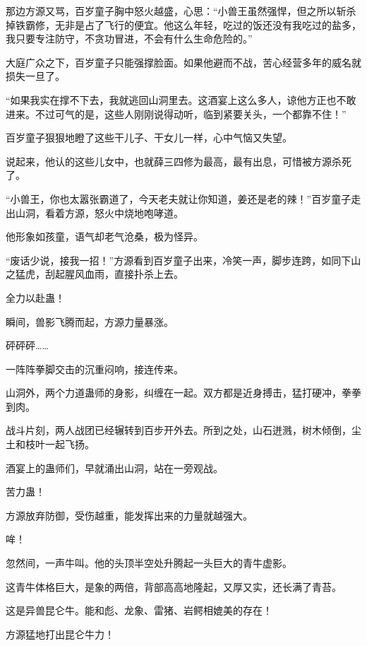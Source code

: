 
\begin{this_body}



那边方源又骂，百岁童子胸中怒火越盛，心思：“小兽王虽然强悍，但之所以斩杀掉铁霸修，无非是占了飞行的便宜。他这么年轻，吃过的饭还没有我吃过的盐多，我只要专注防守，不贪功冒进，不会有什么生命危险的。”

大庭广众之下，百岁童子只能强撑脸面。如果他避而不战，苦心经营多年的威名就损失一旦了。

“如果我实在撑不下去，我就逃回山洞里去。这酒宴上这么多人，谅他方正也不敢进来。不过可气的是，这些人刚刚说得动听，临到紧要关头，一个都靠不住！”

百岁童子狠狠地瞪了这些干儿子、干女儿一样，心中气恼又失望。

说起来，他认的这些儿女中，也就薛三四修为最高，最有出息，可惜被方源杀死了。

“小兽王，你也太嚣张霸道了，今天老夫就让你知道，姜还是老的辣！”百岁童子走出山洞，看着方源，怒火中烧地咆哮道。

他形象如孩童，语气却老气沧桑，极为怪异。

“废话少说，接我一招！”方源看到百岁童子出来，冷笑一声，脚步连跨，如同下山之猛虎，刮起腥风血雨，直接扑杀上去。

全力以赴蛊！

瞬间，兽影飞腾而起，方源力量暴涨。

砰砰砰……

一阵阵拳脚交击的沉重闷响，接连传来。

山洞外，两个力道蛊师的身影，纠缠在一起。双方都是近身搏击，猛打硬冲，拳拳到肉。

战斗片刻，两人战团已经辗转到百步开外去。所到之处，山石迸溅，树木倾倒，尘土和枝叶一起飞扬。

酒宴上的蛊师们，早就涌出山洞，站在一旁观战。

苦力蛊！

方源放弃防御，受伤越重，能发挥出来的力量就越强大。

哞！

忽然间，一声牛叫。他的头顶半空处升腾起一头巨大的青牛虚影。

这青牛体格巨大，是象的两倍，背部高高地隆起，又厚又实，还长满了青苔。

这是异兽昆仑牛。能和彪、龙象、雷猪、岩鳄相媲美的存在！

方源猛地打出昆仑牛力！


\end{this_body}
